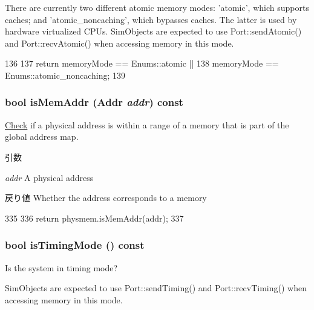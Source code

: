 There are currently two different atomic memory modes: 'atomic', which supports caches; and 'atomic\_\-noncaching', which bypasses caches. The latter is used by hardware virtualized CPUs. SimObjects are expected to use Port::sendAtomic() and Port::recvAtomic() when accessing memory in this mode. 


\begin{DoxyCode}
136                               {
137         return memoryMode == Enums::atomic ||
138             memoryMode == Enums::atomic_noncaching;
139     }
\end{DoxyCode}
\hypertarget{classSystem_a0faeadf06436f8123c7bda01087bb222}{
\subsubsection[{isMemAddr}]{\setlength{\rightskip}{0pt plus 5cm}bool isMemAddr ({\bf Addr} {\em addr}) const}}
\label{classSystem_a0faeadf06436f8123c7bda01087bb222}
\hyperlink{classCheck}{Check} if a physical address is within a range of a memory that is part of the global address map.


\begin{DoxyParams}{引数}
\item[{\em addr}]A physical address \end{DoxyParams}
\begin{DoxyReturn}{戻り値}
Whether the address corresponds to a memory 
\end{DoxyReturn}



\begin{DoxyCode}
335 {
336     return physmem.isMemAddr(addr);
337 }
\end{DoxyCode}
\hypertarget{classSystem_ae04bdd25f4dde1cc1b58b22505aa869c}{
\subsubsection[{isTimingMode}]{\setlength{\rightskip}{0pt plus 5cm}bool isTimingMode () const}}
\label{classSystem_ae04bdd25f4dde1cc1b58b22505aa869c}
Is the system in timing mode?

SimObjects are expected to use Port::sendTiming() and Port::recvTiming() when accessing memory in this mode. 


